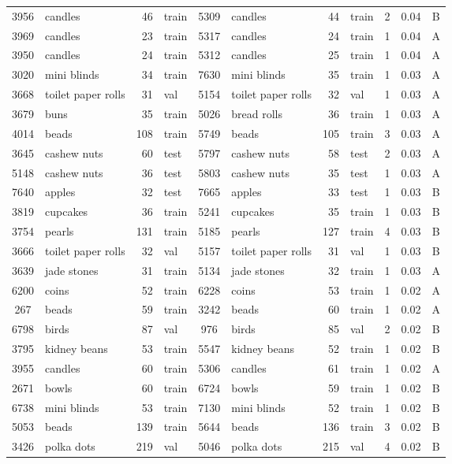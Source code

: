 \documentclass[letterpaper, 11pt]{IEEEtran}
\begin{document}
\begin{table*}[!ht]
{\begin{tabular}{clrlclrlrlc}
3956 & candles & 46 & train & 5309 & candles & 44 & train & 2 & 0.04 & B \\
3969 & candles & 23 & train & 5317 & candles & 24 & train & 1 & 0.04 & A \\
3950 & candles & 24 & train & 5312 & candles & 25 & train & 1 & 0.04 & A\\
3020 & mini blinds & 34 & train & 7630 & mini blinds & 35 & train & 1 & 0.03 & A\\
3668 & toilet paper rolls & 31 & val & 5154 & toilet paper rolls & 32 & val & 1 & 0.03 & A\\
3679 & buns & 35 & train & 5026 & bread rolls & 36 & train & 1 & 0.03 & A\\
4014 & beads & 108 & train & 5749 & beads & 105 & train & 3 & 0.03 & A\\
3645 & cashew nuts & 60 & test & 5797 & cashew nuts & 58 & test & 2 & 0.03 & A\\
5148 & cashew nuts & 36 & test & 5803 & cashew nuts & 35 & test & 1 & 0.03 & A\\
7640 & apples & 32 & test & 7665 & apples & 33 & test & 1 & 0.03 & B\\
3819 & cupcakes & 36 & train & 5241 & cupcakes & 35 & train & 1 & 0.03 & B\\
3754 & pearls & 131 & train & 5185 & pearls & 127 & train & 4 & 0.03 & B\\
3666 & toilet paper rolls & 32 & val & 5157 & toilet paper rolls & 31 & val & 1 & 0.03 & B\\
3639 & jade stones & 31 & train & 5134 & jade stones & 32 & train & 1 & 0.03 & A\\
6200 & coins & 52 & train & 6228 & coins & 53 & train & 1 & 0.02 & A\\
267 & beads & 59 & train & 3242 & beads & 60 & train & 1 & 0.02 & A\\
6798 & birds & 87 & val & 976 & birds & 85 & val & 2 & 0.02 & B\\
3795 & kidney beans & 53 & train & 5547 & kidney beans & 52 & train & 1 & 0.02 & B\\
3955 & candles & 60 & train & 5306 & candles & 61 & train & 1 & 0.02 & A\\
2671 & bowls & 60 & train & 6724 & bowls & 59 & train & 1 & 0.02 & B\\
6738 & mini blinds & 53 & train & 7130 & mini blinds & 52 & train & 1 & 0.02 & B\\
5053 & beads & 139 & train & 5644 & beads & 136 & train & 3 & 0.02 & B\\
3426 & polka dots & 219 & val & 5046 & polka dots & 215 & val & 4 & 0.02 & B\\

\end{tabular}}
\end{table*}
\end{document}
